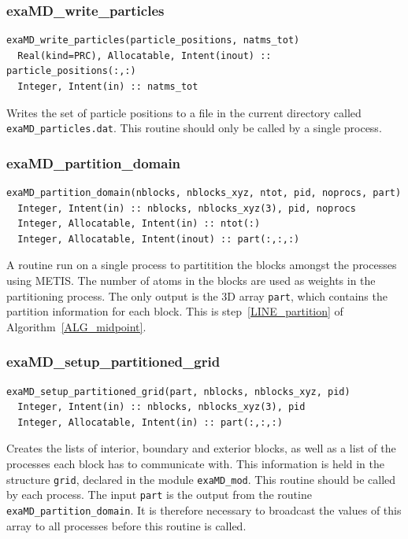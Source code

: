 \documentclass[paper=a4, fontsize=11pt,bibtotoc]{scrartcl}		%
\newcommand{\TT}[1]{\texttt{#1}}
\begin{document}
\subsubsection{exaMD\_write\_particles}

\begin{verbatim}
exaMD_write_particles(particle_positions, natms_tot)
  Real(kind=PRC), Allocatable, Intent(inout) :: particle_positions(:,:)
  Integer, Intent(in) :: natms_tot
\end{verbatim}
Writes the set of particle positions to a file in the current directory called \TT{exaMD\_particles.dat}. This routine should only be called by a single process. 

\subsubsection{exaMD\_partition\_domain}

\begin{verbatim}
exaMD_partition_domain(nblocks, nblocks_xyz, ntot, pid, noprocs, part)
  Integer, Intent(in) :: nblocks, nblocks_xyz(3), pid, noprocs
  Integer, Allocatable, Intent(in) :: ntot(:)
  Integer, Allocatable, Intent(inout) :: part(:,:,:)
\end{verbatim}
A routine run on a single process to partitition the blocks amongst the processes using METIS. The number of atoms in the blocks are used as weights 
in the partitioning process. The only output is the 3D array \TT{part}, which contains the partition information for each block. This is 
step~\ref{LINE_partition} of Algorithm~\ref{ALG_midpoint}.

\subsubsection{exaMD\_setup\_partitioned\_grid}

\begin{verbatim}
exaMD_setup_partitioned_grid(part, nblocks, nblocks_xyz, pid)
  Integer, Intent(in) :: nblocks, nblocks_xyz(3), pid
  Integer, Allocatable, Intent(in) :: part(:,:,:)
\end{verbatim}
Creates the lists of interior, boundary and exterior blocks, as well as a list of the processes each block has to communicate with. This information 
is held in the structure \TT{grid}, declared in the module \TT{exaMD\_mod}. This routine should be called by each process. The input \TT{part} is the 
output from the routine \TT{exaMD\_partition\_domain}. It is therefore necessary to broadcast the values of this array to all processes before this 
routine is called. 
\end{document}
